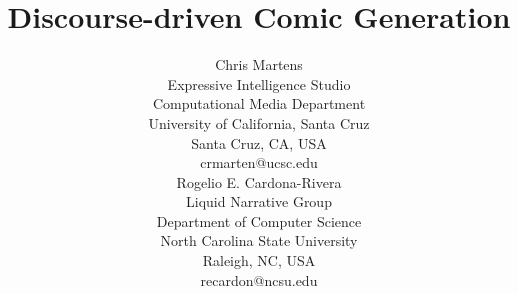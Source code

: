 \documentclass[letterpaper]{article}
\title{Discourse-driven Comic Generation}
\author{
 	Chris Martens\\
 	Expressive Intelligence Studio\\
 	Computational Media Department\\
 	University of California, Santa Cruz\\
 	Santa Cruz, CA, USA\\
 	crmarten@ucsc.edu\\
 	\And
 	Rogelio E. Cardona-Rivera\\
 	Liquid Narrative Group\\
 	Department of Computer Science\\
 	North Carolina State University\\
 	Raleigh, NC, USA\\
 	recardon@ncsu.edu\\
 }
\begin{document}
 
\maketitle
\begin{abstract}
	\begin{quote}
	
	\end{quote}
\end{abstract}













% 



\end{document}
